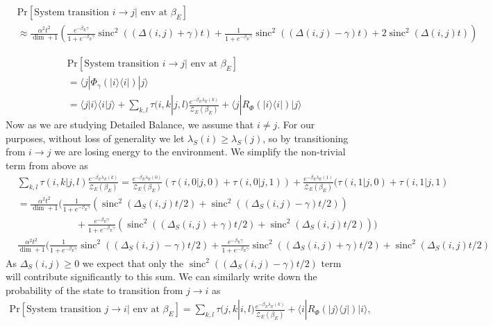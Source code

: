 \documentclass{article}
\newcommand{\ket}[1]{|#1\rangle}
\newcommand{\bra}[1]{\langle #1|}
\newcommand{\braket}[2]{\langle #1|#2\rangle}
\newcommand{\ketbra}[2]{| #1\rangle\! \langle #2|}
\newcommand{\parens}[1]{\left( #1 \right)}
\newcommand{\prob}[1]{\text{Pr}\left[ #1 \right]}
\newcommand{\partfun}{\mathcal{Z}}
\DeclareMathOperator{\sinc}{sinc}
\begin{document}
\begin{align}
    &\prob{\text{System transition } i \to j | \text{ env at } \beta_E} \nonumber \\
    &\approx \frac{\alpha^2 t^2}{\dim + 1} \parens {\frac{e^{-\beta_E \gamma}}{1 + e^{-\beta_E \gamma}}  \sinc^2((\Delta(i,j) + \gamma)t) + \frac{1}{1 + e^{-\beta_E \gamma}} \sinc^2 ((\Delta(i,j) - \gamma)t) + 2 \sinc^2(\Delta(i,j) t)} \nonumber
\end{align}

\begin{align}
    &\prob{\text{System transition } i \to j | \text{ env at } \beta_E} \nonumber \\
    &= \bra{j} \Phi_{\gamma}(\ketbra{i}{i}) \ket{j} \\
    &= \braket{j}{i}\braket{i}{j} + \sum_{k,l} \tau(i, k | j, l) \frac{e^{-\beta_E \lambda_E(k)}}{\partfun_E(\beta_E)} + \bra{j} R_{\Phi}(\ketbra{i}{i})\ket{j}
\end{align}
Now as we are studying Detailed Balance, we assume that $i \neq j$. For our purposes, without loss of generality we let $\lambda_S(i) \geq \lambda_S(j)$, so by transitioning from $i \to j$ we are losing energy to the environment. We simplify the non-trivial term from above as
\begin{align}
    &\sum_{k,l} \tau(i,k| j,l) \frac{e^{-\beta_E \lambda_E(k)}}{\partfun_E(\beta_E)} = \frac{e^{-\beta_E \lambda_E(0)}}{\partfun_E(\beta_E)}(\tau(i,0|j,0) + \tau(i,0|j,1)) + \frac{e^{-\beta_E \lambda_E(1)}}{\partfun_E(\beta_E)} (\tau(i,1|j,0) + \tau(i,1|j,1) \\
    &= \frac{\alpha^2 t^2}{\dim + 1} \bigg(\frac{1}{1 + e^{-\beta_E \gamma}} (\sinc^2(\Delta_S(i,j)t/2) + \sinc^2((\Delta_S(i,j) - \gamma)t/2)) \nonumber \\
    &\quad \quad \quad \quad \quad \quad  +\frac{e^{-\beta_E \gamma}}{1 + e^{-\beta_E \gamma}} (\sinc^2((\Delta_S(i,j) + \gamma)t/2) + \sinc^2(\Delta_S(i,j) t/2)) \bigg) \\
    &\frac{\alpha^2 t^2}{\dim + 1} \bigg(\frac{1}{1 + e^{-\beta_E \gamma}} \sinc^2((\Delta_S(i,j) - \gamma)t/2) + \frac{e^{-\beta_E \gamma}}{1 + e^{-\beta_E \gamma}} \sinc^2((\Delta_S(i,j) + \gamma)t/2) + \sinc^2(\Delta_S(i,j)t/2)
\end{align}
As $\Delta_S(i,j) \geq 0 $ we expect that only the $\sinc^2((\Delta_S(i,j) - \gamma) t/2)$ term will contribute significantly to this sum. We can similarly write down the probability of the state to transition from $j \to i$ as
\begin{align}
    \prob{\text{System transition } j \to i | \text{ env at } \beta_E} = \sum_{k,l} \tau(j,k|i,l) \frac{e^{-\beta_E \lambda_E(k)}}{\partfun_E(\beta_E)} + \bra{i} R_{\Phi}(\ketbra{j}{j})\ket{i},
\end{align}
\end{document}
